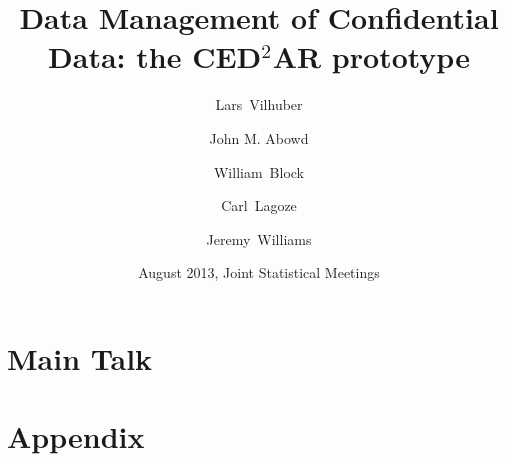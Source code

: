 \documentclass[xcolor=table,compress]{beamer}
\title[Data Management of Confidential Data]{Data Management of Confidential Data: the CED$^2$AR prototype}
\author[Vilhuber, Abowd, Block, Lagoze, Williams]{%
  Lars~Vilhuber\inst{1} \and
  John M. Abowd\inst{1} 
  \and William~Block\inst{2}%
  \and Carl~Lagoze\inst{3}%
  \and Jeremy~Williams\inst{2}%
}
\institute[Cornell]{
  \inst{1}%
   Labor Dynamics Institute,
  ILR,
\and \inst{2} Cornell Institute for Social and Economic Research,
\and \inst{3} University of Michigan}%
\date[August 2013]{August 2013,  Joint Statistical Meetings}
\begin{document}
\frame{\titlepage}

%


\part<presentation>{Main Talk}

%
%


\ifpdf
{}
\fi

\part<presentation>{Appendix}


\ifpdf
{}
\fi
\end{document}

